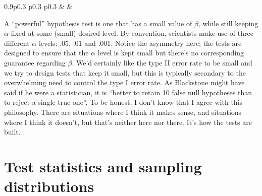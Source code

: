 \documentclass[
  a4paper,
]{book}
\begin{document}
\begin{table}[ht]
\begin{centerbox}
\begin{threeparttable}
\begin{tabularx}{0.9\textwidth}{p{} p{} p{}}
 &
 &
 \tabularnewline[-0.5pt]


\end{tabularx} 

\end{threeparttable}\par\end{centerbox}

\end{table}
 

A ``powerful'' hypothesis test is one that has a small value of
\(\beta\), while still keeping \(\alpha\) fixed at some (small) desired
level. By convention, scientists make use of three different \(\alpha\)
levels: \(.05\), \(.01\) and \(.001\). Notice the asymmetry here; the
tests are designed to ensure that the \(\alpha\) level is kept small but
there's no corresponding guarantee regarding \(\beta\). We'd certainly
like the type II error rate to be small and we try to design tests that
keep it small, but this is typically secondary to the overwhelming need
to control the type I error rate. As Blackstone might have said if he
were a statistician, it is ``better to retain 10 false null hypotheses
than to reject a single true one''. To be honest, I don't know that I
agree with this philosophy. There are situations where I think it makes
sense, and situations where I think it doesn't, but that's neither here
nor there. It's how the tests are built.

\hypertarget{test-statistics-and-sampling-distributions}{%
\section{Test statistics and sampling
distributions}\label{test-statistics-and-sampling-distributions}}
\end{document}
